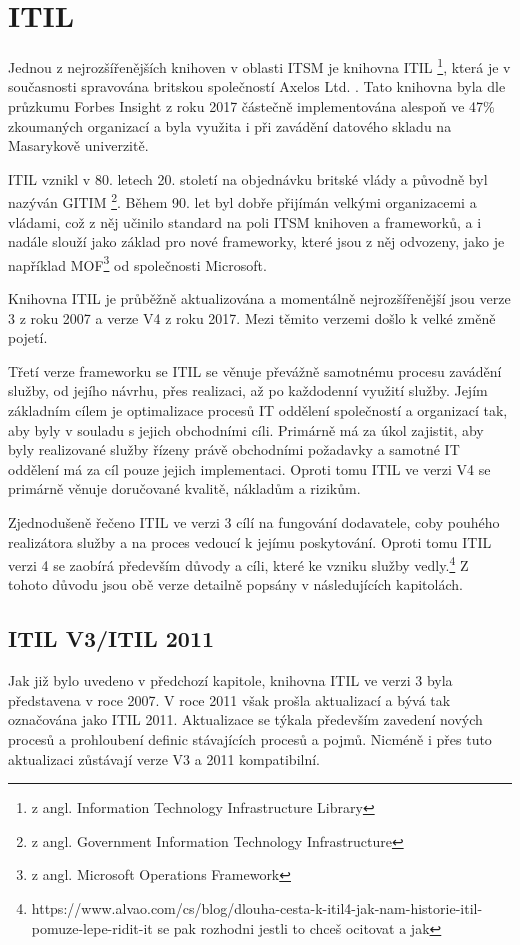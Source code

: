\documentclass[
  digital,     %
  twoside,     %
  lof,         %
  lot,         %
]{fithesis4}
\begin{document}
\section{ITIL}
Jednou z nejrozšířenějších knihoven v oblasti ITSM je knihovna ITIL \footnote{z angl. Information Technology Infrastructure Library}, která je v současnosti spravována britskou společností Axelos Ltd. \parencite[s.~31]{Matula2017}. Tato knihovna byla dle průzkumu Forbes Insight z roku 2017 částečně implementována alespoň ve 47\% zkoumaných organizací\parencite{Watts3082017} a byla využita i při  zavádění datového skladu na Masarykově univerzitě. 

ITIL vznikl v 80. letech 20. století na objednávku britské vlády a původně byl nazýván GITIM \footnote{z angl. Government Information Technology Infrastructure}. Během 90. let byl dobře přijímán velkými organizacemi a vládami, což z něj učinilo standard na poli ITSM knihoven a frameworků, a i nadále slouží jako základ pro nové frameworky, které jsou z něj odvozeny, jako je například MOF\footnote{z angl. Microsoft Operations Framework} od společnosti Microsoft. \parencite[s. ~31]{Matula2017}

Knihovna ITIL je průběžně aktualizována a momentálně nejrozšířenější jsou verze 3 z roku 2007 a verze V4 z roku 2017. Mezi těmito verzemi došlo k velké změně pojetí. 

Třetí verze frameworku se ITIL se věnuje převážně samotnému procesu zavádění služby, od jejího návrhu, přes realizaci, až po každodenní využití služby. Jejím základním cílem je optimalizace procesů IT oddělení společností a organizací tak, aby byly v souladu s jejich obchodními cíli. Primárně má za úkol zajistit, aby byly realizované služby řízeny právě obchodními požadavky a samotné IT oddělení má za cíl pouze jejich implementaci.\parencite[s.~8]{Carlidge2007} Oproti tomu ITIL ve verzi V4 se primárně věnuje doručované kvalitě, nákladům a rizikům. 

Zjednodušeně řečeno ITIL ve verzi 3 cílí na fungování dodavatele, coby pouhého realizátora služby a na proces vedoucí k jejímu poskytování. Oproti tomu ITIL verzi 4 se zaobírá především důvody a cíli, které ke vzniku služby vedly.\footnote{https://www.alvao.com/cs/blog/dlouha-cesta-k-itil4-jak-nam-historie-itil-pomuze-lepe-ridit-it se pak rozhodni jestli to chceš ocitovat a jak}
Z tohoto důvodu jsou obě verze detailně popsány v následujících kapitolách.  
\subsection{ITIL V3/ITIL 2011}
Jak již bylo uvedeno v předchozí kapitole, knihovna ITIL ve verzi 3 byla představena v roce 2007. V roce 2011 však prošla aktualizací a bývá tak označována jako ITIL 2011. Aktualizace se týkala především zavedení nových procesů a prohloubení definic stávajících procesů a pojmů. Nicméně i přes tuto aktualizaci zůstávají verze V3 a 2011 kompatibilní.\parencite{Kempter2722013}
\end{document}
